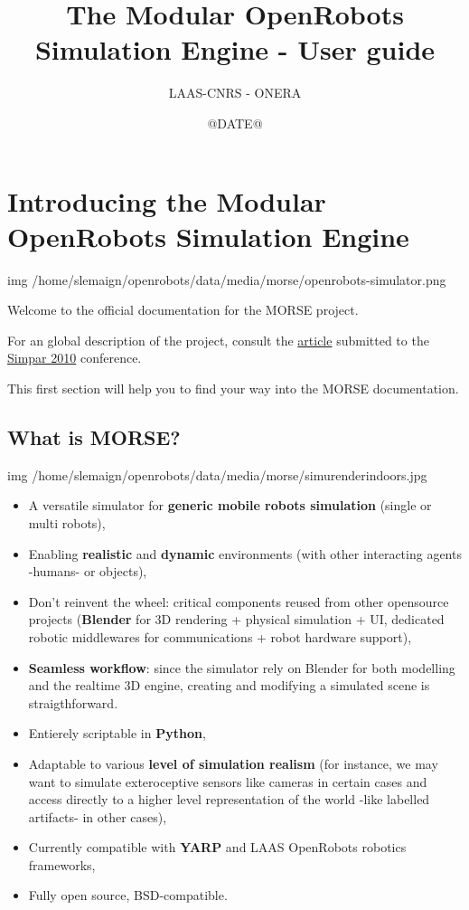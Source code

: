 \documentclass[twoside,a4paper,10pt]{report}
\title{The Modular OpenRobots Simulation Engine - User guide}
\author{LAAS-CNRS - ONERA}
\date{@DATE@}
\newcommand{\dokutitlelevelone}[1]{\chapter{#1}}
\newcommand{\dokutitleleveltwo}[1]{\section{#1}}
\newcommand{\dokubold}[1]{\textbf{#1}}
\newcommand{\dokuitem}{\item}
\begin{document}
\sffamily
\allsectionsfont{\sffamily}


\thispagestyle{empty}
\maketitle
\thispagestyle{empty}
\cleardoublepage
\tableofcontents
\newpage
\thispagestyle{plain}
\cleardoublepage
\newpage






\dokutitlelevelone{Introducing the Modular OpenRobots Simulation Engine}
\label{55d4061a5aa52cfc82c5474279f29bd9}%
\label{a80da1282f2c775bbc5f2c92c836968b}%

img /home/slemaign/openrobots/data/media/morse/openrobots-simulator.png

Welcome to the official documentation for the MORSE project.

For an global description of the project, consult the 
\href{http://homepages.laas.fr/gechever/Documents/morse-21062010.pdf}{ article}
submitted to the \href{http://www.simpar.org/}{ Simpar 2010} conference.

This first section will help you to find your way into the MORSE documentation.


\dokutitleleveltwo{What is MORSE?}
\label{cb90401e2d53fdeab390406232e6c72f}%

img /home/slemaign/openrobots/data/media/morse/simu{\textunderscore}render{\textunderscore}indoors.jpg



\begin{itemize}
\dokuitem  A versatile simulator for \dokubold{generic mobile robots simulation} (single or multi robots),
\dokuitem  Enabling \dokubold{realistic} and \dokubold{dynamic} environments (with other interacting agents -humans- or objects), 
\dokuitem  Don't reinvent the wheel: critical components reused from other opensource projects (\dokubold{Blender} for 3D rendering + physical simulation + UI, dedicated robotic middlewares for communications + robot hardware support),
\dokuitem  \dokubold{Seamless workflow}: since the simulator rely on Blender for both modelling and the realtime 3D engine, creating and modifying a simulated scene is straigthforward.
\dokuitem  Entierely scriptable in \dokubold{Python},
\dokuitem  Adaptable to various \dokubold{level of simulation realism} (for instance, we may want to simulate exteroceptive sensors like cameras in certain cases and access directly to a higher level representation of the world -like labelled artifacts- in other cases),
\dokuitem  Currently compatible with \dokubold{YARP} and LAAS OpenRobots robotics frameworks,
\dokuitem  Fully open source, BSD-compatible.
\end{itemize}
\end{document}
